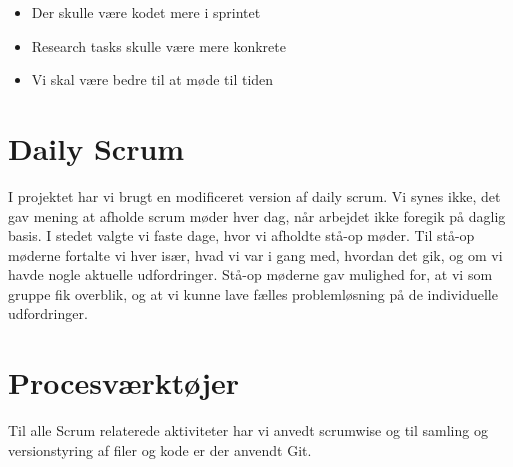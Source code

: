 \begin{itemize}
	\item Der skulle være kodet mere i sprintet
	\item Research tasks skulle være mere konkrete
	\item Vi skal være bedre til at møde til tiden
\end{itemize}


\section{Daily Scrum}
I projektet har vi brugt en modificeret version af daily scrum. Vi synes ikke, det gav mening at afholde scrum møder hver dag, når arbejdet ikke foregik på daglig basis. I stedet valgte vi faste dage, hvor vi afholdte stå-op møder. Til stå-op møderne fortalte vi hver især, hvad vi var i gang med, hvordan det gik, og om vi havde nogle aktuelle udfordringer. Stå-op møderne gav mulighed for, at vi som gruppe fik overblik, og at vi kunne lave fælles problemløsning på de individuelle udfordringer.

\section{Procesværktøjer}
Til alle Scrum relaterede aktiviteter har vi anvedt scrumwise\cite{SCRUMWISE} og til samling og versionstyring af filer og kode er der anvendt Git\cite{GIT}. 


